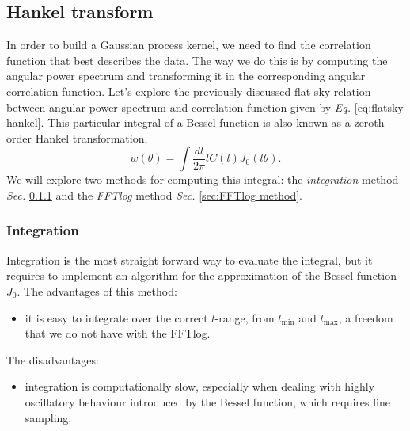 \subsection{Hankel transform}
\label{sec:Hankel transform}
In order to build a Gaussian process kernel, we need to find the correlation function that best describes the data. The way we do this is by computing the angular power spectrum and transforming it in the corresponding angular correlation function. Let's explore the previously discussed flat-sky relation between angular power spectrum and correlation function given by \textit{Eq. }\eqref{eq:flatsky hankel}. This particular integral of a Bessel function is also known as a zeroth order Hankel transformation,
\begin{equation}
    w(\theta) = \int \frac{dl}{2\pi} l C(l) J_0(l\theta).
    \label{eq:C-w hankel}
\end{equation}
We will explore two methods for computing this integral: the \textit{integration} method \textit{Sec. }\ref{sec:integration method} and the \textit{FFTlog} method \textit{Sec. }\ref{sec:FFTlog method}.

\subsubsection{Integration}
\label{sec:integration method}
Integration is the most straight forward way to evaluate the integral, but it requires to implement an algorithm for the approximation of the Bessel function $J_0$. The advantages of this method:
\begin{itemize}
    \item it is easy to integrate over the correct $l$-range, from $l_{\text{min}}$ and $l_{\text{max}}$, a freedom that we do not have with the FFTlog.
\end{itemize}
The disadvantages:
\begin{itemize}
    \item integration is computationally slow, especially when dealing with highly oscillatory behaviour introduced by the Bessel function, which requires fine sampling.
\end{itemize}


